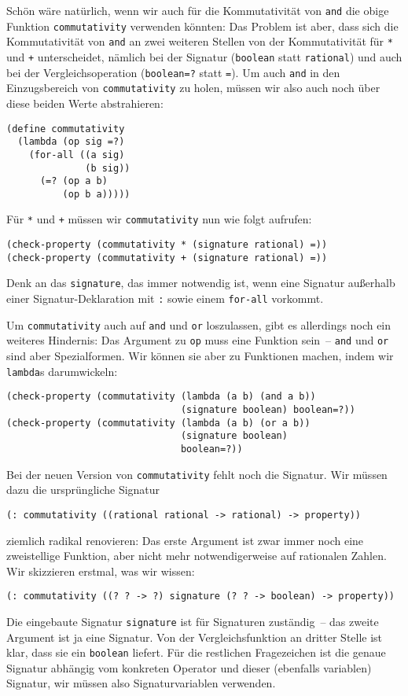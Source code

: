 Schön wäre natürlich, wenn wir auch für die Kommutativität von
\lstinline{and} die obige Funktion \lstinline{commutativity} verwenden
könnten: Das Problem ist aber, dass sich die Kommutativität von
\lstinline{and} an zwei weiteren Stellen von der Kommutativität für
\lstinline{*} und \lstinline{+} unterscheidet, nämlich bei der Signatur
(\lstinline{boolean} statt \lstinline{rational}) und auch bei der
Vergleichsoperation (\lstinline{boolean=?} statt \lstinline{=}).  Um auch
\lstinline{and} in den Einzugsbereich von \lstinline{commutativity} zu
holen, müssen wir also auch noch über diese beiden Werte abstrahieren:
%
\begin{lstlisting}
(define commutativity
  (lambda (op sig =?)
    (for-all ((a sig)
              (b sig))
      (=? (op a b)
          (op b a)))))
\end{lstlisting}
%
Für \lstinline{*} und \lstinline{+} müssen wir \lstinline{commutativity} nun
wie folgt aufrufen:
%
\begin{lstlisting}
(check-property (commutativity * (signature rational) =))
(check-property (commutativity + (signature rational) =))
\end{lstlisting}
%
Denk an das \lstinline{signature}, das immer notwendig ist, wenn
eine Signatur außerhalb einer Signatur-Deklaration mit \lstinline{:} sowie
einem \lstinline{for-all} vorkommt.

Um \lstinline{commutativity} auch auf \lstinline{and} und \lstinline{or}
loszulassen, gibt es allerdings noch ein weiteres Hindernis: Das
Argument zu \lstinline{op} muss eine Funktion sein~-- \lstinline{and} und
\lstinline{or} sind aber Spezialformen.  Wir können sie aber zu
Funktionen machen, indem wir \lstinline{lambda}s darumwickeln:
%
\begin{lstlisting}
(check-property (commutativity (lambda (a b) (and a b))
                               (signature boolean) boolean=?))
(check-property (commutativity (lambda (a b) (or a b))
                               (signature boolean)
                               boolean=?))
\end{lstlisting}
%
Bei der neuen Version von \lstinline{commutativity} fehlt noch die
Signatur.  Wir müssen dazu die ursprüngliche Signatur
%
\begin{lstlisting}
(: commutativity ((rational rational -> rational) -> property))
\end{lstlisting}
%
ziemlich radikal renovieren: Das erste Argument ist zwar immer noch
eine zweistellige Funktion, aber nicht mehr notwendigerweise auf
rationalen Zahlen.  Wir skizzieren erstmal, was wir wissen:
%
\begin{lstlisting}
(: commutativity ((? ? -> ?) signature (? ? -> boolean) -> property))
\end{lstlisting}
%
Die eingebaute Signatur \lstinline{signature} ist für Signaturen
zuständig~-- das zweite Argument ist ja eine Signatur.  Von der
Vergleichsfunktion an dritter Stelle ist klar, dass sie ein
\lstinline{boolean} liefert.  Für die restlichen Fragezeichen ist die
genaue Signatur abhängig vom konkreten Operator und dieser (ebenfalls
variablen) Signatur, wir müssen also Signaturvariablen verwenden.

